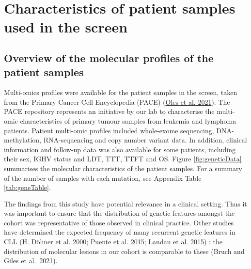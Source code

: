 \documentclass[11pt, a4paper, twosided]{book}
\begin{document}
\hypertarget{characteristics-of-patient-samples-used-in-the-screen}{%
\section{Characteristics of patient samples used in the screen}\label{characteristics-of-patient-samples-used-in-the-screen}}

\hypertarget{overview-of-the-molecular-profiles-of-the-patient-samples}{%
\subsection{Overview of the molecular profiles of the patient samples}\label{overview-of-the-molecular-profiles-of-the-patient-samples}}

Multi-omics profiles were available for the patient samples in the screen, taken from the Primary Cancer Cell Encyclopedia (PACE) (\protect\hyperlink{ref-R-BloodCancerMultiOmics2017}{Oles et al. 2021}). The PACE repository represents an initiative by our lab to characterise the multi-omic characteristics of primary tumour samples from leukemia and lymphoma patients. Patient multi-omic profiles included whole-exome sequencing, DNA-methylation, RNA-sequencing and copy number variant data. In addition, clinical information and follow-up data was also available for some patients, including their sex, IGHV status and LDT, TTT, TTFT and OS. Figure \ref{fig:geneticData} summarises the molecular characteristics of the patient samples. For a summary of the number of samples with each mutation, see Appendix Table \ref{tab:geneTable}.

The findings from this study have potential relevance in a clinical setting. Thus it was important to ensure that the distribution of genetic features amongst the cohort was representative of those observed in clinical practice. Other studies have determined the expected frequency of many recurrent genetic features in CLL (\protect\hyperlink{ref-Dohner2000}{H. Döhner et al. 2000}; \protect\hyperlink{ref-Puente2015}{Puente et al. 2015}; \protect\hyperlink{ref-Landau2015}{Landau et al. 2015}) : the distribution of molecular lesions in our cohort is comparable to these (Bruch and Giles et al.~2021).
\end{document}
